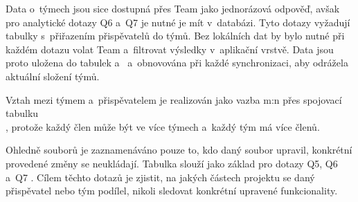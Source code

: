 Data o~týmech jsou sice dostupná přes Team \API {} jako jednorázová \JSON odpověď, avšak pro analytické dotazy Q6 a~Q7  je nutné je mít v~databázi. Tyto dotazy vyžadují \SQL {} tabulky  s~přiřazením přispěvatelů do týmů. Bez lokálních dat by bylo nutné při každém dotazu volat Team \API a~filtrovat výsledky v~aplikační vrstvě. Data jsou proto uložena do tabulek  a~ a~obnovována při každé synchronizaci, aby odrážela aktuální složení týmů.

Vztah mezi týmem a~přispěvatelem je realizován jako vazba m:n přes spojovací tabulku \\ , protože každý člen může být ve více týmech a~každý tým má více členů.

Ohledně souborů je zaznamenáváno pouze to, kdo daný soubor upravil, konkrétní provedené změny se neukládají. Tabulka  slouží jako základ pro dotazy Q5, Q6 a~Q7 . Cílem těchto dotazů je zjistit, na jakých částech projektu se daný přispěvatel nebo tým podílel, nikoli sledovat konkrétní upravené funkcionality.
